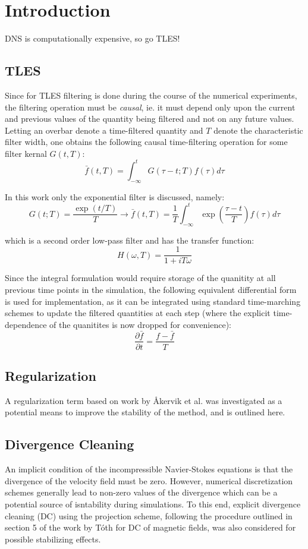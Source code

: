 \chapter{Introduction}


DNS is computationally expensive, so go TLES!

\section{TLES}

Since for TLES filtering is done during the course of the numerical experiments, the filtering operation must be \emph{causal}, ie. it must depend only upon the current and previous values of the quantity being filtered and not on any future values. Letting an overbar denote a time-filtered quantity and $T$ denote the characteristic filter width, one obtains the following causal time-filtering operation for some filter kernal $G(t,T)$:
$$\bar{f}(t,T)=\int_{-\infty}^{t}G(\tau -t;T)f(\tau)d\tau$$

In this work only the exponential filter is discussed, namely:
$$G(t;T)=\frac{\exp(t/T)}{T} \longrightarrow \bar{f}(t,T)=\frac{1}{T}\int_{-\infty}^{t}\exp\left(\frac{\tau-t}{T}\right)f(\tau)d\tau$$

which is a second order low-pass filter and has the transfer function:
$$H(\omega,T)=\frac{1}{1+iT\omega}$$

Since the integral formulation would require storage of the quanitity at all previous time points in the simulation, the following equivalent differential form is used for implementation, as it can be integrated using standard time-marching schemes to update the filtered quantities at each step (where the explicit time-dependence of the quanitites is now dropped for convenience):
$$\frac{\partial \bar{f}}{\partial t}=\frac{f-\bar{f}}{T}$$

\section{Regularization}

A regularization term based on work by \AA kervik et al. \cite{Akervik2006} was investigated as a potential means to improve the stability of the method, and is outlined here.

\section{Divergence Cleaning}

An implicit condition of the incompressible Navier-Stokes equations is that the divergence of the velocity field must be zero. However, numerical discretization schemes generally lead to non-zero values of the divergence which can be a potential source of isntability during simulations. To this end, explicit divergence cleaning (DC) using the projection scheme, following the procedure outlined in section 5 of the work by T\'oth \cite{Toth2000} for DC of magnetic fields, was also considered for possible stabilizing effects.